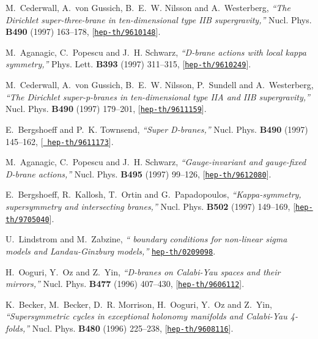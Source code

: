 \documentclass[a4paper,12pt]{article}
\numberwithin{equation}{section}
\begin{document}
\begin{thebibliography}{10}
M.~Cederwall, A.~von Gussich, B.~E.~W. Nilsson and A.~Westerberg, {\it ``The
  {D}irichlet super-three-brane in ten-dimensional type {IIB} supergravity,''}
  Nucl. Phys. {\bf B490} (1997) 163--178,
  [\href{http://arXiv.org/abs/hep-th/9610148}{{\tt hep-th/9610148}}].

M.~Aganagic, C.~Popescu and J.~H. Schwarz, {\it ``{D}-brane actions with local
  kappa symmetry,''}  Phys. Lett. {\bf B393} (1997) 311--315,
  [\href{http://arXiv.org/abs/hep-th/9610249}{{\tt hep-th/9610249}}].

M.~Cederwall, A.~von Gussich, B.~E.~W. Nilsson, P.~Sundell and A.~Westerberg,
  {\it ``The {D}irichlet super-p-branes in ten-dimensional type {IIA} and {IIB}
  supergravity,''}  Nucl. Phys. {\bf B490} (1997) 179--201,
  [\href{http://arXiv.org/abs/hep-th/9611159}{{\tt hep-th/9611159}}].

E.~Bergshoeff and P.~K. Townsend, {\it ``Super {D}-branes,''}  Nucl. Phys. {\bf
  B490} (1997) 145--162, [\href{http://arXiv.org/abs/hep-th/9611173}{{\tt
  hep-th/9611173}}].

M.~Aganagic, C.~Popescu and J.~H. Schwarz, {\it ``Gauge-invariant and
  gauge-fixed {D}-brane actions,''}  Nucl. Phys. {\bf B495} (1997) 99--126,
  [\href{http://arXiv.org/abs/hep-th/9612080}{{\tt hep-th/9612080}}].

E.~Bergshoeff, R.~Kallosh, T.~Ortin and G.~Papadopoulos, {\it ``Kappa-symmetry,
  supersymmetry and intersecting branes,''}  Nucl. Phys. {\bf B502} (1997)
  149--169, [\href{http://arXiv.org/abs/hep-th/9705040}{{\tt hep-th/9705040}}].

U.~Lindstrom and M.~Zabzine, {\it ``{\coordHE{}} boundary conditions for
  non-linear sigma models and {L}andau-{G}inzburg models,''}
  \href{http://arXiv.org/abs/hep-th/0209098}{{\tt hep-th/0209098}}.

H.~Ooguri, Y.~Oz and Z.~Yin, {\it ``{D}-branes on {C}alabi-{Y}au spaces and
  their mirrors,''}  Nucl. Phys. {\bf B477} (1996) 407--430,
  [\href{http://arXiv.org/abs/hep-th/9606112}{{\tt hep-th/9606112}}].

K.~Becker, M.~Becker, D.~R. Morrison, H.~Ooguri, Y.~Oz and Z.~Yin, {\it
  ``Supersymmetric cycles in exceptional holonomy manifolds and {C}alabi-{Y}au
  4-folds,''}  Nucl. Phys. {\bf B480} (1996) 225--238,
  [\href{http://arXiv.org/abs/hep-th/9608116}{{\tt hep-th/9608116}}].


\end{thebibliography}
\end{document}

